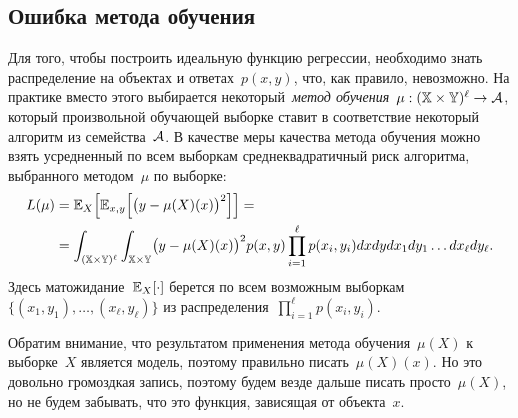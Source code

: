\documentclass[12pt,fleqn]{article}
\begin{document}
\subsection{Ошибка метода обучения}
Для того, чтобы построить идеальную функцию регрессии, необходимо
знать распределение на объектах и ответах~$p(x, y)$, что, как правило, невозможно.
На практике вместо этого выбирается некоторый~\emph{метод обучения}~$\mu: (\XX \times \YY)^\ell \to \AA$,
который произвольной обучающей выборке ставит в соответствие
некоторый алгоритм из семейства~$\AA$.
В качестве меры качества метода обучения можно взять усредненный по всем выборкам
среднеквадратичный риск алгоритма, выбранного методом~$\mu$ по выборке:
\begin{align}
\label{eq:learnMethodLoss}
    L(\mu)
    &=
    \EE_{X} \Bigl[
        \EE_{x, y} \Bigl[
            \bigl(
            y - \mu(X)(x)
            \bigr)^2
        \Bigr]
    \Bigr]
    =\\ \notag
    &=
    \int_{(\XX \times \YY)^\ell}
    \int_{\XX \times \YY}
        \bigl(
        y - \mu(X)(x)
        \bigr)^2
        p(x, y)
        \prod_{i = 1}^{\ell}
            p(x_i, y_i)
    dx dy
    dx_1 dy_1
    \dots
    dx_\ell dy_\ell
    .
\end{align}
Здесь матожидание~$\EE_{X} [\cdot]$ берется по всем
возможным выборкам~$\{(x_1, y_1), \dots, (x_\ell, y_\ell)\}$
из распределения~$\prod_{i = 1}^{\ell} p(x_i, y_i)$.

Обратим внимание, что результатом применения метода обучения~$\mu(X)$ к выборке~$X$ является модель,
поэтому правильно писать~$\mu(X)(x)$.
Но это довольно громоздкая запись, поэтому будем везде дальше писать просто~$\mu(X)$,
но не будем забывать, что это функция, зависящая от объекта~$x$.
\end{document}
